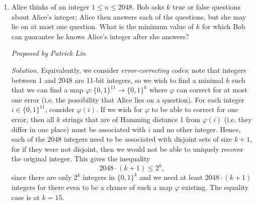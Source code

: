 \documentclass[10pt]{article}
\newcommand{\proposed}[1]
{
\vspace{5pt}
\noindent\textit{Proposed by #1}
}
\newcommand{\solution}
{
\vspace{5pt}
\noindent\textit{Solution.}\qquad
}
\newcommand{\vp}{\varphi}
\newcommand{\ra}{\rightarrow}
\begin{document}
\begin{enumerate}
Given a configuration $C$, let $\hat{\sigma}(C)$ denote the number of swaps the greedy algorithm takes, and let $\sigma(C)$ denote the minimum number of swaps actually necessary to perform the task. Find the maximum value over all configurations $C$ of $\hat{\sigma}(C)-\sigma(C)$.

\proposed{Cody Johnson and Victor Xu}

\solution Let there be $2n$ balls. We first claim $\hat{\sigma}(C) - \sigma(C) \leq n-2$. The greedy algorithm does at most $n-1$ swaps since, after each swap, if the iteration is at index $i$ then the color of the balls at positions $i$ and $i+1$ must be different, and there are only $2n-2$ potential spots where we could ever swap something (note that we never swap at the end). Trivially, $\sigma(C) \geq 1$ if $C$ is not already alternating, and so $\hat{\sigma}(C) - \sigma(C) \leq n-1 - 1 = n-2$, as desired.

\par Now we show $n-1$ swaps is achievable. Consider the configuration $BBWBWBWB\dots BWBWW$, where the first two balls are the same color, then the colors alternate, and the last two balls are the same color. It's easy to verify that for this configuration we have $\hat{\sigma}(C) - \sigma(C) = n-2$. Thus $n-2$ is the maximum achievable value.

\par Since $2n = 1720$, it follows that $n-2 = \boxed{858}$.



\item Alice thinks of an integer $1 \le n \le 2048$. Bob asks $k$ true or false questions about Alice's integer; Alice then answers each of the questions, but she may lie on at most one question. What is the minimum value of $k$ for which Bob can guarantee he knows Alice's integer after she answers?

\proposed{Patrick Lin}

\solution Equivalently, we consider \textit{error-correcting codes}; note that integers between 1 and 2048 are 11-bit integers, so we wish to find a minimal $k$ such that we can find a map $\vp:\{0,1\}^{11} \ra \{0,1\}^k$ where $\vp$ can correct for at most one error (i.e. the possibility that Alice lies on a question). For each integer $i \in \{0,1\}^{11}$, consider $\vp(i)$. If we wish for $\vp$ to be able to correct for one error, then all $k$ strings that are of Hamming distance 1 from $\vp(i)$ (i.e. they differ in one place) must be associated with $i$ and no other integer. Hence, each of the $2048$ integers need to be associated with disjoint sets of size $k+1$, for if they were not disjoint, then we would not be able to uniquely recover the original integer. This gives the inequality
\[2048\cdot(k+1) \le 2^k,\]
since there are only $2^k$ integers in $\{0,1\}^k$ and we need at least $2048\cdot(k+1)$ integers for there even to be a chance of such a map $\vp$ existing. The equality case is at $k = \boxed{15}$.


\end{enumerate}
\end{document}
